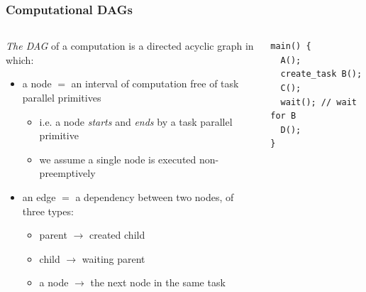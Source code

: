 \documentclass[12pt,dvipdfmx]{beamer}
\newcommand{\ao}[1]{{\color{blue}#1}}
\begin{document}
\begin{frame}[fragile]
\frametitle{Computational DAGs}
\begin{columns}[t]
\begin{column}{0.65\textwidth}
\ao{\em The DAG} of a computation is a directed acyclic graph in which:
\begin{itemize}
\item a node $=$ an interval of computation 
free of task parallel primitives
\begin{itemize}
\item i.e. a node {\em starts} and {\em ends} 
  by a task parallel primitive
\item we assume a single node is executed non-preemptively
\end{itemize}

\item an edge $=$ a dependency between two nodes, of three types:
  \begin{itemize}
  \item parent $\rightarrow$ created child
  \item child $\rightarrow$ waiting parent
  \item a node $\rightarrow$ the next node in the same task
  \end{itemize}
\end{itemize}
\end{column}

\begin{column}{0.30\textwidth}
\begin{lstlisting}
main() {
  A();
  create_task B();
  C();
  wait(); // wait for B
  D();
}    
\end{lstlisting}


\end{column}
\end{columns}
\end{frame}
\end{document}
